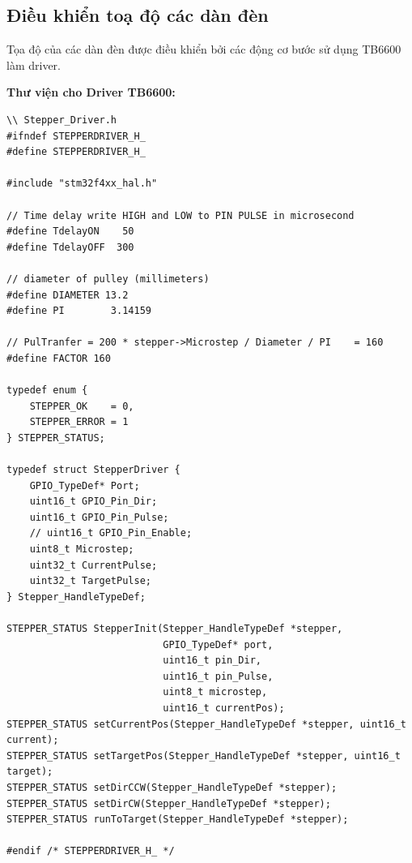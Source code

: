 \subsection{Điều khiển toạ độ các dàn đèn}
Tọa độ của các dàn đèn được điều khiển bởi các động cơ bước sử dụng TB6600 làm driver. 

\textbf{Thư viện cho Driver TB6600:}
\begin{lstlisting}
\\ Stepper_Driver.h
#ifndef STEPPERDRIVER_H_
#define STEPPERDRIVER_H_

#include "stm32f4xx_hal.h"

// Time delay write HIGH and LOW to PIN PULSE in microsecond
#define TdelayON    50
#define TdelayOFF  300

// diameter of pulley (millimeters)
#define DIAMETER 13.2
#define PI        3.14159

// PulTranfer = 200 * stepper->Microstep / Diameter / PI    = 160
#define FACTOR 160

typedef enum {
    STEPPER_OK    = 0,
    STEPPER_ERROR = 1
} STEPPER_STATUS;

typedef struct StepperDriver {
    GPIO_TypeDef* Port;
    uint16_t GPIO_Pin_Dir;
    uint16_t GPIO_Pin_Pulse;
    // uint16_t GPIO_Pin_Enable;
    uint8_t Microstep;
    uint32_t CurrentPulse;
    uint32_t TargetPulse;
} Stepper_HandleTypeDef;

STEPPER_STATUS StepperInit(Stepper_HandleTypeDef *stepper,
                           GPIO_TypeDef* port,
                           uint16_t pin_Dir,
                           uint16_t pin_Pulse,
                           uint8_t microstep,
                           uint16_t currentPos);
STEPPER_STATUS setCurrentPos(Stepper_HandleTypeDef *stepper, uint16_t current);
STEPPER_STATUS setTargetPos(Stepper_HandleTypeDef *stepper, uint16_t target);
STEPPER_STATUS setDirCCW(Stepper_HandleTypeDef *stepper);
STEPPER_STATUS setDirCW(Stepper_HandleTypeDef *stepper);
STEPPER_STATUS runToTarget(Stepper_HandleTypeDef *stepper);

#endif /* STEPPERDRIVER_H_ */
\end{lstlisting}

